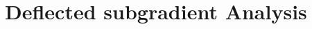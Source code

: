 \documentclass[notitlepage]{article}
\begin{document}
\section{Deflected subgradient Analysis}

\end{document}
